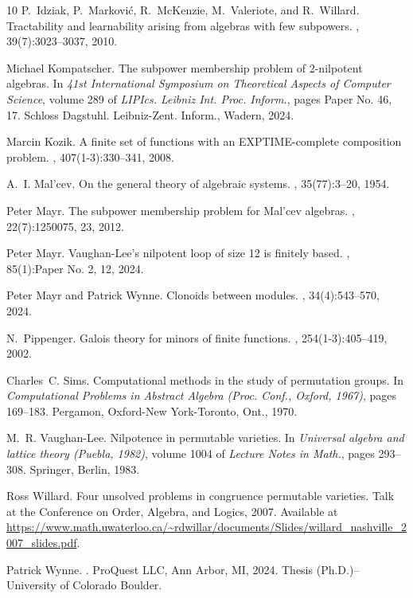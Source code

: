 \documentclass[12pt]{amsart}
\numberwithin{equation}{section}
\theoremstyle{plain}
\theoremstyle{definition}
\begin{document}
\begin{thebibliography}{10}
P.~Idziak, P.~Markovi\'{c}, R.~McKenzie, M.~Valeriote, and R.~Willard.
\newblock Tractability and learnability arising from algebras with few
  subpowers.
, 39(7):3023--3037, 2010.

Michael Kompatscher.
\newblock The subpower membership problem of 2-nilpotent algebras.
\newblock In {\em 41st {I}nternational {S}ymposium on {T}heoretical {A}spects
  of {C}omputer {S}cience}, volume 289 of {\em LIPIcs. Leibniz Int. Proc.
  Inform.}, pages Paper No. 46, 17. Schloss Dagstuhl. Leibniz-Zent. Inform.,
  Wadern, 2024.

Marcin Kozik.
\newblock A finite set of functions with an {EXPTIME}-complete composition
  problem.
, 407(1-3):330--341, 2008.

A.~I. Mal'cev.
\newblock On the general theory of algebraic systems.
, 35(77):3--20, 1954.

Peter Mayr.
\newblock The subpower membership problem for {M}al'cev algebras.
, 22(7):1250075, 23, 2012.

Peter Mayr.
\newblock Vaughan-{L}ee's nilpotent loop of size 12 is finitely based.
, 85(1):Paper No. 2, 12, 2024.

Peter Mayr and Patrick Wynne.
\newblock Clonoids between modules.
, 34(4):543--570, 2024.

N.~Pippenger.
\newblock Galois theory for minors of finite functions.
, 254(1-3):405--419, 2002.

Charles~C. Sims.
\newblock Computational methods in the study of permutation groups.
\newblock In {\em Computational {P}roblems in {A}bstract {A}lgebra ({P}roc.
  {C}onf., {O}xford, 1967)}, pages 169--183. Pergamon, Oxford-New York-Toronto,
  Ont., 1970.

M.~R. Vaughan-Lee.
\newblock Nilpotence in permutable varieties.
\newblock In {\em Universal algebra and lattice theory ({P}uebla, 1982)},
  volume 1004 of {\em Lecture Notes in Math.}, pages 293--308. Springer,
  Berlin, 1983.

Ross Willard.
\newblock Four unsolved problems in congruence permutable varieties.
\newblock Talk at the Conference on Order, Algebra, and Logics, 2007.
\newblock Available at
  \url{https://www.math.uwaterloo.ca/~rdwillar/documents/Slides/willard_nashville_2007_slides.pdf}.

Patrick Wynne.
.
\newblock ProQuest LLC, Ann Arbor, MI, 2024.
\newblock Thesis (Ph.D.)--University of Colorado Boulder.

\end{thebibliography}

%
%
%
\end{document}
